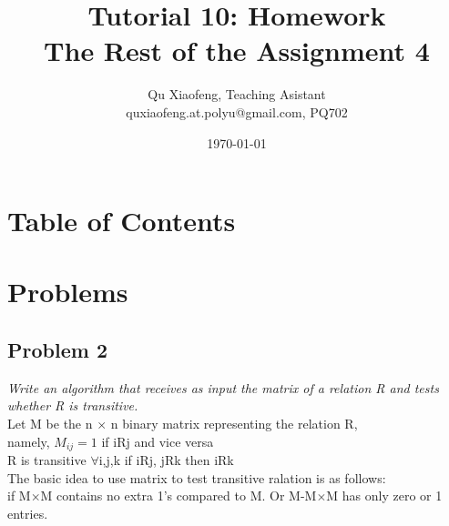 \documentclass[handout]{beamer}
\title[Tutorial 10]{Tutorial 10: Homework \\ The Rest of the Assignment 4}
\author[COMP210]{Qu Xiaofeng\texorpdfstring{, Teaching Asistant\\\tiny{quxiaofeng.at.polyu@gmail.com, PQ702}}{}}
\institute{COMP210\\Discrete Structure}
\date{\today}
\begin{document}
\frame{\titlepage}

\section*{Table of Contents}

    \begin{frame}{\secname}
        \tableofcontents
    \end{frame}




\section{Problems}



    \subsection{Problem 2}
    
        \begin{frame}[c]{\subsecname}
            \emph{Write an algorithm that receives as input the matrix of a relation R and tests whether R is transitive.}\\$\;$\\\pause
            Let M be the n $\times$ n binary matrix representing the relation R,\\
            namely, $M_{ij}=1$ if iRj and vice versa\\
            R is transitive $\forall$i,j,k  if iRj, jRk then iRk\\
            The basic idea to use matrix to test transitive ralation is as follows:\\
            if M$\times$M contains no extra 1\rq{}s compared to M. Or M-M$\times$M has only zero or 1 entries.
        \end{frame}
        
\end{document}
